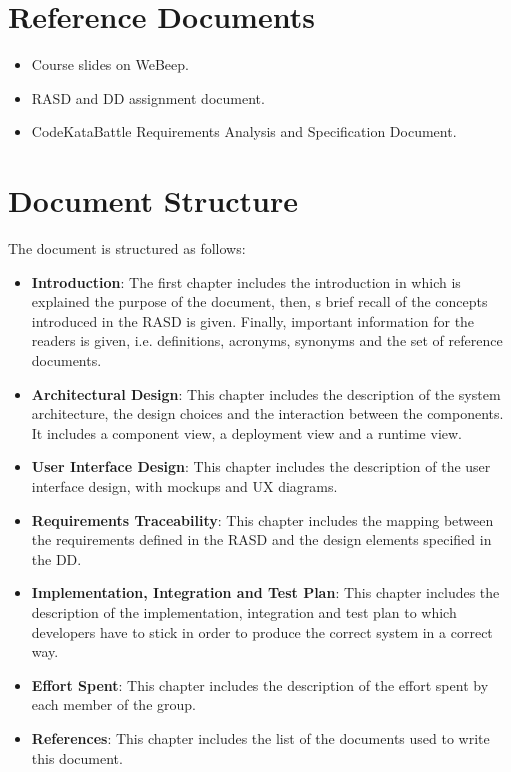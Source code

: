 \section{Reference Documents}
\begin{itemize}
    \item Course slides on WeBeep. 
    \item RASD and DD assignment document.
    \item CodeKataBattle Requirements Analysis and Specification Document.
\end{itemize}

\section{Document Structure}
The document is structured as follows:
\begin{itemize}
    \item \textbf{Introduction}: The first chapter includes the introduction in which is explained the purpose of the document, then, s brief recall of the concepts introduced in the RASD is given.
    Finally, important information for the readers is given, i.e. definitions, acronyms, synonyms and the set of reference documents.
    \item \textbf{Architectural Design}: This chapter includes the description of the system architecture, the design choices and the interaction between the components. It includes a component view, a deployment view and a runtime view.
    \item \textbf{User Interface Design}: This chapter includes the description of the user interface design, with mockups and UX diagrams.
    \item \textbf{Requirements Traceability}: This chapter includes the mapping between the requirements defined in the RASD and the design elements specified in the DD.
    \item \textbf{Implementation, Integration and Test Plan}: This chapter includes the description of the implementation, integration and test plan to which developers have to stick in order to produce the correct system in a correct way.
    \item \textbf{Effort Spent}: This chapter includes the description of the effort spent by each member of the group.
    \item \textbf{References}: This chapter includes the list of the documents used to write this document.
\end{itemize}